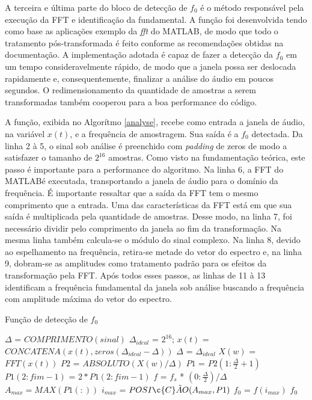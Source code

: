 A terceira e última parte do bloco de detecção de $f_0$ é o método responsável pela execução da FFT e identificação da fundamental. A função foi desenvolvida tendo como base as aplicações exemplo da \textit{fft} do MATLAB\rreg, de modo que todo o tratamento pós-transformada é feito conforme as recomendações obtidas na documentação. A implementação adotada é capaz de fazer a detecção da $f_0$ em um tempo consideravelmente rápido, de modo que a janela possa ser deslocada rapidamente e, consequentemente, finalizar a análise do áudio em poucos segundos. O redimensionamento da quantidade de amostras a serem transformadas também cooperou para a boa performance do código.


A função, exibida no Algorítmo \ref{analyse}, recebe como entrada a janela de áudio, na variável $x(t)$, e a frequência de amostragem. Sua saída é a $f_0$ detectada. Da linha 2 à 5, o sinal sob análise é preenchido com \textit{padding} de zeros de modo a satisfazer o tamanho de $2^{16}$ amostras. Como visto na fundamentação teórica, este passo é importante para a performance do algoritmo. Na linha 6, a FFT do MATLAB\rreg é executada, transportando a janela de áudio para o domínio da frequência. É importante ressaltar que a saída da FFT tem o mesmo comprimento que a entrada. Uma das características da FFT está em que sua saída é multiplicada pela quantidade de amostras. Desse modo, na linha 7, foi necessário dividir pelo comprimento da janela ao fim da transformação. Na mesma linha também calcula-se o módulo do sinal complexo. Na linha 8, devido ao espelhamento na frequência, retira-se metade do vetor do espectro e, na linha 9, dobram-se as amplitudes como tratamento padrão para os efeitos da transformação pela FFT. Após todos esses passos, as linhas de 11 à 13 identificam a frequência fundamental da janela sob análise buscando a frequência com amplitude máxima do vetor do espectro.
\\
\begin{algorithm}
	\caption{Função de detecção de $f_0$}
	\label{analyse}
	\begin{algorithmic}[1]
			\State $\Delta$ = $COMPRIMENTO(sinal)$
			\State $\Delta_{ideal}$ = $2^{16}$;
			\State $x(t)$ = $CONCATENA(x(t), zeros(\Delta_{ideal}- \Delta))$
			\State $\Delta$ = $\Delta_{ideal}$
			\State $X(w)$ = $FFT(x(t))$
			\State $P2$ = $ABSOLUTO(X(w)/\Delta)$
			\State $P1$ = $P2(1:\frac{\Delta}{2} + 1)$
			\State $P1(2:fim-1)$ = $2 * P1(2:fim-1)$
			\State $f$ = $f_s$ * $(0 : \frac{\Delta}{2})/\Delta$
			\State $A_{max} = MAX(P1(:))$
			\State $i_{max}$ = $POSI\c{C}\tilde{A}O(A_{max}, P1)$
			\State $f_0$ = $f(i_{max})$
			\State \Return $f_0$
		\EndFunction
	\end{algorithmic}
\end{algorithm}

